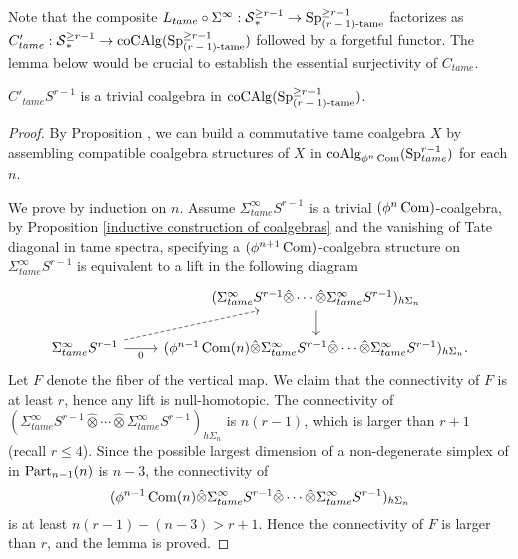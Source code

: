 \clearpage
Note that the composite $L_{tame}\circ \Sigma^{\infty}: \operatorname{\mathcal{S}}_{*}^{\geq r-1}\to \operatorname{Sp}^{\geq r-1}_{\text{($r-1$)-tame}}$ factorizes as $C'_{tame}: \operatorname{\mathcal{S}}_{*}^{\geq r-1}\to \operatorname{coCAlg}(\operatorname{Sp}^{\geq r-1}_{\text{($r-1$)-tame}})$ followed by a forgetful functor. The lemma below would be crucial to establish the essential surjectivity of $C_{tame}$.

\begin{lemma}

	\label{Sigma S^n is a trivial coalgebra}
	$C'_{tame} S^{r-1}$ is a trivial coalgebra in $\operatorname{coCAlg}(\operatorname{Sp}^{\geq r-1}_{\text{($r-1$)-tame}})$.
\end{lemma}
\begin{proof}
	By Proposition , we can build a commutative tame coalgebra $X$ by assembling compatible coalgebra structures of $X$ in $\operatorname{coAlg}_{\phi^n \operatorname{Com}}(\operatorname{Sp}_{tame}^{r-1})$ for each $n$.
	
	We prove by induction on $n$.
	Assume $\Sigma^{\infty}_{tame}S^{r-1}$ is a trivial $(\phi^n \operatorname{Com})$-coalgebra, by Proposition \ref{inductive construction of coalgebras} and the vanishing of Tate diagonal in tame spectra, specifying a $(\phi^{n+1} \operatorname{Com})$-coalgebra structure  on $\Sigma^{\infty}_{tame}S^{r-1}$ is equivalent to a lift in the following diagram
	\[
	\begin{tikzcd}
		& (\Sigma^{\infty}_{tame}S^{r-1} \hat{\otimes} \cdots \hat{\otimes} \Sigma^{\infty}_{tame}S^{r-1})_{h\Sigma_n}\\
		\Sigma^{\infty}_{tame}S^{r-1} & (\phi^{n-1}\Com(n)\hat{\otimes} \Sigma^{\infty}_{tame}S^{r-1} \hat{\otimes} \cdots \hat{\otimes}\Sigma^{\infty}_{tame}S^{r-1})_{h\Sigma_n}
		\arrow[from = 2-1, to = 1-2, dashed]
		\arrow[from = 2-1, to = 2-2, "0" below]
		\arrow[from = 1-2, to = 2-2].
	\end{tikzcd}
	\]
	Let $F$ denote the fiber of the vertical map. We claim that the connectivity of $F$ is at least $r$, hence any lift is null-homotopic.
	The connectivity of $(\Sigma^{\infty}_{tame}S^{r-1} \hat{\otimes} \cdots \hat{\otimes} \Sigma^{\infty}_{tame}S^{r-1})_{h\Sigma_n}$ is $n(r-1)$, which is larger than $r+1$ (recall $r\leq 4$). Since the possible largest dimension of a non-degenerate simplex of in $\operatorname{Part}_{n-1}(n)$ is $n-3$, the connectivity of 
	$$
	(\phi^{n-1}\operatorname{Com}(n)\hat{\otimes} \Sigma^{\infty}_{tame}S^{r-1} \hat{\otimes} \cdots \hat{\otimes}\Sigma^{\infty}_{tame}S^{r-1})_{h\Sigma_n}
	$$
	is at least $n(r-1)-(n-3) > r+1$. Hence the connectivity of $F$ is larger than $r$, and the lemma is proved.
\end{proof}

